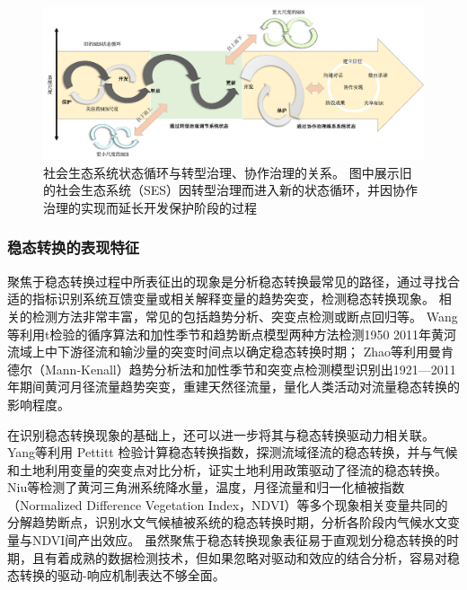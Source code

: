 \begin{figure}[!ht] %
    \includegraphics[width=\textwidth]{img/ch1/ch1_governance_driver.png}
    \caption[社会\textendash{}生态系统状态循环]{社会\textendash{}生态系统状态循环与转型治理、协作治理的关系。
    图中展示旧的社会\textendash{}生态系统（SES）因转型治理而进入新的状态循环，并因协作治理的实现而延长开发保护阶段的过程}\label{ch1:fig:governance_driver}
\end{figure}

\subsubsection{稳态转换的表现特征}

聚焦于稳态转换过程中所表征出的现象是分析稳态转换最常见的路径，通过寻找合适的指标识别系统互馈变量或相关解释变量的趋势突变，检测稳态转换现象。
相关的检测方法非常丰富，常见的包括趋势分析、突变点检测或断点回归等。
Wang等利用t检验的循序算法和加性季节和趋势断点模型两种方法检测1950 \textendash{} 2011年黄河流域上中下游径流和输沙量的突变时间点以确定稳态转换时期\cite{wang2014}；
Zhao等利用曼\textendash{}肯德尔（Mann-Kenall）趋势分析法和加性季节和突变点检测模型识别出1921—2011年期间黄河月径流量趋势突变，重建天然径流量，量化人类活动对流量稳态转换的影响程度\cite{zhao2015}。

在识别稳态转换现象的基础上，还可以进一步将其与稳态转换驱动力相关联。
Yang等利用 Pettitt 检验计算稳态转换指数，探测流域径流的稳态转换，并与气候和土地利用变量的突变点对比分析，证实土地利用政策驱动了径流的稳态转换\cite{yang2012a}。
Niu等检测了黄河三角洲系统降水量，温度，月径流量和归一化植被指数（Normalized Difference Vegetation Index，NDVI）等多个现象相关变量共同的分解趋势断点，识别水文\textendash{}气候\textendash{}植被系统的稳态转换时期，分析各阶段内气候水文变量与NDVI间产出效应\cite{niu2020}。
虽然聚焦于稳态转换现象表征易于直观划分稳态转换的时期，且有着成熟的数据检测技术，但如果忽略对驱动和效应的结合分析，容易对稳态转换的驱动-响应机制表达不够全面。

